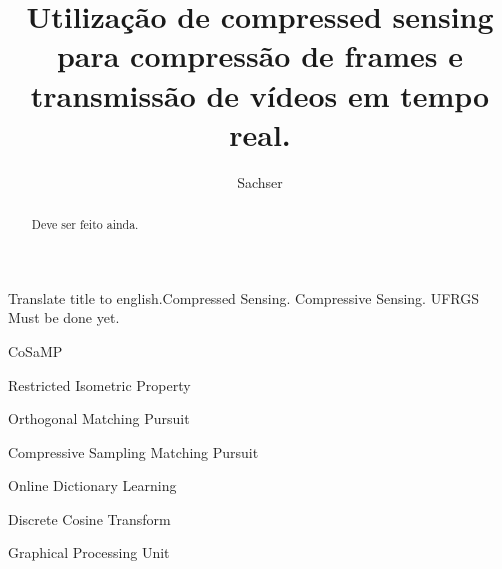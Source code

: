 \documentclass[cic,tc]{iiufrgs}
\title{Utilização de compressed sensing para compressão de frames e transmissão de vídeos em tempo real.}
\author{Sachser}{Eduardo}
\begin{document}
\maketitle





\begin{abstract}
    Deve ser feito ainda.
\end{abstract}

\begin{englishabstract}{Translate title to english.}{Compressed Sensing. Compressive Sensing. UFRGS}
    Must be done yet.
\end{englishabstract}

\listoffigures

\listoftables

\begin{listofabbrv}{CoSaMP}
    \item[RIP] Restricted Isometric Property
    \item[OMP] Orthogonal Matching Pursuit
    \item[CoSaMP] Compressive Sampling Matching Pursuit 
    \item[ODL] Online Dictionary Learning 
    \item[DCT] Discrete Cosine Transform 
    \item[GPU] Graphical Processing Unit
\end{listofabbrv}
\end{document}
